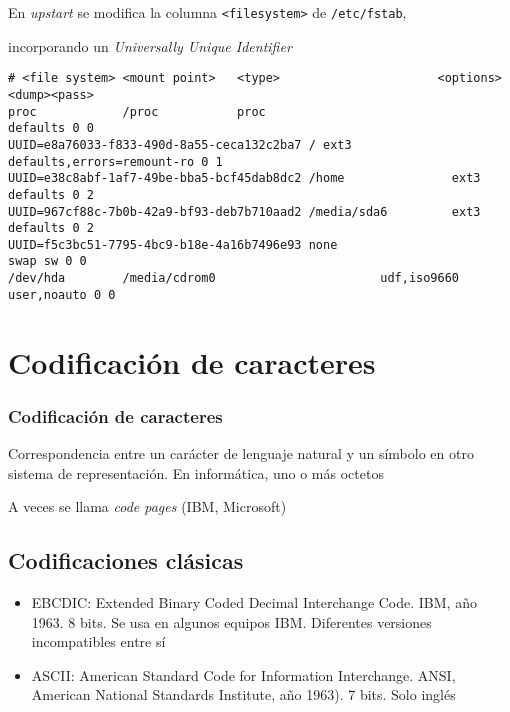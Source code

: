 \documentclass[ucs]{beamer}
\begin{document}
\begin{frame}[fragile]

En \emph{upstart} se modifica la columna \verb|<filesystem>| de \verb|/etc/fstab|,

incorporando un \emph{Universally Unique Identifier }
\begin{tiny}
\begin{verbatim}
# <file system> <mount point>   <type>                      <options><dump><pass>
proc            /proc           proc                               defaults 0 0
UUID=e8a76033-f833-490d-8a55-ceca132c2ba7 / ext3 defaults,errors=remount-ro 0 1
UUID=e38c8abf-1af7-49be-bba5-bcf45dab8dc2 /home               ext3 defaults 0 2
UUID=967cf88c-7b0b-42a9-bf93-deb7b710aad2 /media/sda6         ext3 defaults 0 2
UUID=f5c3bc51-7795-4bc9-b18e-4a16b7496e93 none                      swap sw 0 0
/dev/hda        /media/cdrom0                       udf,iso9660 user,noauto 0 0
\end{verbatim}

\end{tiny}



\end{frame}




\section{Codificación de caracteres}
\begin{frame}[fragile]
\frametitle{Codificación de caracteres}
Correspondencia entre un carácter de lenguaje natural
y un símbolo en otro sistema de representación. En informática,
uno o más octetos

A veces se llama \emph{code pages} (IBM, Microsoft)

\subsection{Codificaciones clásicas}

\begin{itemize}	
\item 
EBCDIC: Extended Binary Coded Decimal Interchange Code. IBM, año 1963. 8 bits. 
Se usa en algunos equipos IBM.
Diferentes versiones incompatibles entre sí
\item 
ASCII: American Standard Code for Information Interchange. 
ANSI, American National Standards Institute, año 1963). 7 bits. Solo inglés
\end{itemize}
\end{frame}
\end{document}
